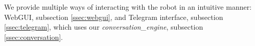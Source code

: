 We provide multiple ways of interacting with the robot in an intuitive manner: WebGUI, subsection \ref{ssec:webgui}, and Telegram\texttrademark\hspace{0em} interface, subsection \ref{ssec:telegram}, which uses our \emph{conversation\_engine}, subsection \ref{ssec:conversation}.
